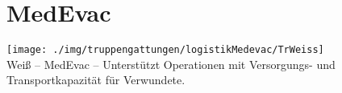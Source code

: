 \section{MedEvac}
\texttt{[image: ./img/truppengattungen/logistikMedevac/TrWeiss]}\\
Weiß -- \acf{MedEvac} -- Unterstützt Operationen mit Versorgungs- und Transportkapazität für Verwundete.